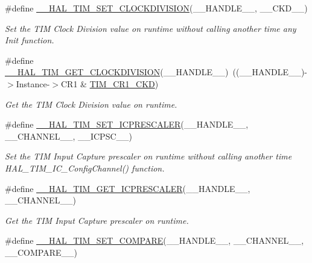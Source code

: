 \begin{DoxyCompactItemize}
\#define \hyperlink{group___t_i_m___exported___macros_ga8aa84d77c670890408092630f9b2bdc4}{\+\_\+\+\_\+\+H\+A\+L\+\_\+\+T\+I\+M\+\_\+\+S\+E\+T\+\_\+\+C\+L\+O\+C\+K\+D\+I\+V\+I\+S\+I\+ON}(\+\_\+\+\_\+\+H\+A\+N\+D\+L\+E\+\_\+\+\_\+,  \+\_\+\+\_\+\+C\+K\+D\+\_\+\+\_\+)
\begin{DoxyCompactList}\small\item\em Set the T\+IM Clock Division value on runtime without calling another time any Init function. \end{DoxyCompactList}\item 
\#define \hyperlink{group___t_i_m___exported___macros_gae6bc91bb5940bce52828c690f24001b8}{\+\_\+\+\_\+\+H\+A\+L\+\_\+\+T\+I\+M\+\_\+\+G\+E\+T\+\_\+\+C\+L\+O\+C\+K\+D\+I\+V\+I\+S\+I\+ON}(\+\_\+\+\_\+\+H\+A\+N\+D\+L\+E\+\_\+\+\_\+)~((\+\_\+\+\_\+\+H\+A\+N\+D\+L\+E\+\_\+\+\_\+)-\/$>$Instance-\/$>$C\+R1 \& \hyperlink{group___peripheral___registers___bits___definition_gacacc4ff7e5b75fd2e4e6b672ccd33a72}{T\+I\+M\+\_\+\+C\+R1\+\_\+\+C\+KD})
\begin{DoxyCompactList}\small\item\em Get the T\+IM Clock Division value on runtime. \end{DoxyCompactList}\item 
\#define \hyperlink{group___t_i_m___exported___macros_gaeb106399b95ef02cec502f58276a0e92}{\+\_\+\+\_\+\+H\+A\+L\+\_\+\+T\+I\+M\+\_\+\+S\+E\+T\+\_\+\+I\+C\+P\+R\+E\+S\+C\+A\+L\+ER}(\+\_\+\+\_\+\+H\+A\+N\+D\+L\+E\+\_\+\+\_\+,  \+\_\+\+\_\+\+C\+H\+A\+N\+N\+E\+L\+\_\+\+\_\+,  \+\_\+\+\_\+\+I\+C\+P\+S\+C\+\_\+\+\_\+)
\begin{DoxyCompactList}\small\item\em Set the T\+IM Input Capture prescaler on runtime without calling another time H\+A\+L\+\_\+\+T\+I\+M\+\_\+\+I\+C\+\_\+\+Config\+Channel() function. \end{DoxyCompactList}\item 
\#define \hyperlink{group___t_i_m___exported___macros_gabfeec6b3c67a5747c7dbd20aff61d8e2}{\+\_\+\+\_\+\+H\+A\+L\+\_\+\+T\+I\+M\+\_\+\+G\+E\+T\+\_\+\+I\+C\+P\+R\+E\+S\+C\+A\+L\+ER}(\+\_\+\+\_\+\+H\+A\+N\+D\+L\+E\+\_\+\+\_\+,  \+\_\+\+\_\+\+C\+H\+A\+N\+N\+E\+L\+\_\+\+\_\+)
\begin{DoxyCompactList}\small\item\em Get the T\+IM Input Capture prescaler on runtime. \end{DoxyCompactList}\item 
\#define \hyperlink{group___t_i_m___exported___macros_ga300d0c9624c3b072d3afeb7cef639b66}{\+\_\+\+\_\+\+H\+A\+L\+\_\+\+T\+I\+M\+\_\+\+S\+E\+T\+\_\+\+C\+O\+M\+P\+A\+RE}(\+\_\+\+\_\+\+H\+A\+N\+D\+L\+E\+\_\+\+\_\+,  \+\_\+\+\_\+\+C\+H\+A\+N\+N\+E\+L\+\_\+\+\_\+,  \+\_\+\+\_\+\+C\+O\+M\+P\+A\+R\+E\+\_\+\+\_\+)

\end{DoxyCompactItemize}
